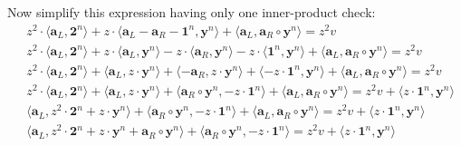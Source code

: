\documentclass[../lecture-notes-148x210.tex]{subfiles}
\begin{document}
Now simplify this expression having only one inner-product check:
\begin{equation*}
    \begin{aligned}
        & z^2 \cdot \langle \mathbf{a}_L, \mathbf{2}^n \rangle + z \cdot \langle \mathbf{a}_L - \mathbf{a}_R - \mathbf{1}^n, \mathbf{y}^n \rangle + \langle \mathbf{a}_L, \mathbf{a}_R \circ \mathbf{y}^n \rangle = z^2v \\
        & z^2 \cdot \langle \mathbf{a}_L, \mathbf{2}^n \rangle + \boxed{z \cdot \langle \mathbf{a}_L, \mathbf{y}^n \rangle - z \cdot \langle \mathbf{a}_R, \mathbf{y}^n \rangle - z \cdot \langle \mathbf{1}^n, \mathbf{y}^n \rangle} + \langle \mathbf{a}_L, \mathbf{a}_R \circ \mathbf{y}^n \rangle = z^2v \\
        & z^2 \cdot \langle \mathbf{a}_L, \mathbf{2}^n \rangle + \boxed{\langle \mathbf{a}_L, z \cdot \mathbf{y}^n \rangle + \langle - \mathbf{a}_R, z \cdot \mathbf{y}^n \rangle + \langle - z \cdot \mathbf{1}^n, \mathbf{y}^n \rangle} + \langle \mathbf{a}_L, \mathbf{a}_R \circ \mathbf{y}^n \rangle = z^2v \\
        & z^2 \cdot \langle \mathbf{a}_L, \mathbf{2}^n \rangle + \langle \mathbf{a}_L, z \cdot \mathbf{y}^n \rangle + \boxed{\langle \mathbf{a}_R \circ \mathbf{y}^n, - z \cdot \mathbf{1}^n \rangle} + \langle \mathbf{a}_L, \mathbf{a}_R \circ \mathbf{y}^n \rangle = z^2v + \boxed{\langle z \cdot \mathbf{1}^n, \mathbf{y}^n \rangle} \\
        & \boxed{\langle \mathbf{a}_L, z^2 \cdot \mathbf{2}^n + z \cdot \mathbf{y}^n \rangle}  + \langle \mathbf{a}_R \circ \mathbf{y}^n, - z \cdot \mathbf{1}^n \rangle + \boxed{\langle\mathbf{a}_L, \mathbf{a}_R \circ \mathbf{y}^n \rangle} = z^2v + \langle z \cdot \mathbf{1}^n, \mathbf{y}^n \rangle \\
        & \boxed{\langle \mathbf{a}_L, z^2 \cdot \mathbf{2}^n + z \cdot \mathbf{y}^n + \mathbf{a}_R \circ \mathbf{y}^n\rangle}  + \langle \mathbf{a}_R \circ \mathbf{y}^n, - z \cdot \mathbf{1}^n \rangle = z^2v + \langle z \cdot \mathbf{1}^n, \mathbf{y}^n \rangle \\
    \end{aligned}
\end{equation*}
\end{document}
